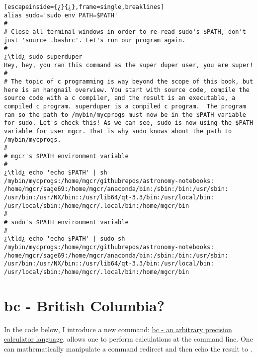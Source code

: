 \begin{lstlisting}[escapeinside={¿}{¿},frame=single,breaklines]
alias sudo='sudo env PATH=$PATH'
#
# Close all terminal windows in order to re-read sudo's $PATH, don't just 'source .bashrc'. Let's run our program again.
#
¿\tld¿ sudo superduper
Hey, hey, you ran this command as the super duper user, you are super!
#
# The topic of c programming is way beyond the scope of this book, but here is an hangnail overview. You start with source code, compile the source code with a c compiler, and the result is an executable, a compiled c program. superduper is a compiled c program.  The program ran so the path to /mybin/mycprogs must now be in the $PATH variable for sudo. Let's check this! As we can see, sudo is now using the $PATH variable for user mgcr. That is why sudo knows about the path to /mybin/mycprogs.
#
# mgcr's $PATH environment variable
#
¿\tld¿ echo 'echo $PATH' | sh
/mybin/mycprogs:/home/mgcr/githubrepos/astronomy-notebooks:
/home/mgcr/sage69:/home/mgcr/anaconda/bin:/sbin:/bin:/usr/sbin:
/usr/bin:/usr/NX/bin::/usr/lib64/qt-3.3/bin:/usr/local/bin:
/usr/local/sbin:/home/mgcr/.local/bin:/home/mgcr/bin
#
# sudo's $PATH environment variable
#
¿\tld¿ echo 'echo $PATH' | sudo sh
/mybin/mycprogs:/home/mgcr/githubrepos/astronomy-notebooks:
/home/mgcr/sage69:/home/mgcr/anaconda/bin:/sbin:/bin:/usr/sbin:
/usr/bin:/usr/NX/bin::/usr/lib64/qt-3.3/bin:/usr/local/bin:
/usr/local/sbin:/home/mgcr/.local/bin:/home/mgcr/bin
\end{lstlisting}

\section{bc - British Columbia?}

In the code below, I introduce a new command: \href{https://www.gnu.org/software/bc/manual/html_mono/bc.html}{bc - an arbitrary precision calculator language}.  allows one to perform calculations at the command line. One can mathematically manipulate a command redirect and then echo the result to .


